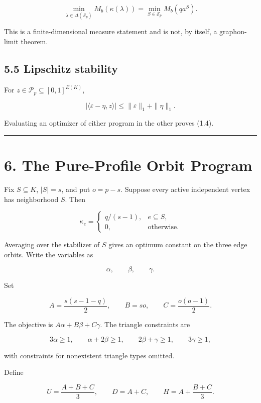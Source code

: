 \documentclass[11pt,a4paper]{article}
\begin{document}
\[
\boxed{
\min_{\lambda\in\Delta(\mathcal S_p)}M_b(\kappa(\lambda))
=
\min_{S\in\mathcal S_p}M_b(qa^S).
}
\tag{5.5}
\]

This is a finite-dimensional measure statement and is not, by itself, a graphon-limit theorem.

\subsection{5.5 Lipschitz stability}\label{lipschitz-stability}

For \(z\in\mathcal P_p\subseteq[0,1]^{E(K)}\),

\[
|\langle\varepsilon-\eta,z\rangle|
\le
\|\varepsilon\|_1+\|\eta\|_1.
\]

Evaluating an optimizer of either program in the other proves (1.4).

\begin{center}\rule{0.5\linewidth}{0.5pt}\end{center}

\section{6. The Pure-Profile Orbit Program}\label{the-pure-profile-orbit-program}

Fix \(S\subseteq K\), \(|S|=s\), and put \(o=p-s\). Suppose every active independent vertex has neighborhood \(S\). Then

\[
\kappa_e=
\begin{cases}
q/(s-1),&e\subseteq S,\\
0,&\text{otherwise}.
\end{cases}
\]

Averaging over the stabilizer of \(S\) gives an optimum constant on the three edge orbits. Write the variables as

\[
\alpha,\qquad\beta,\qquad\gamma.
\]

Set

\[
A=\frac{s(s-1-q)}2,
\qquad
B=so,
\qquad
C=\frac{o(o-1)}2.
\tag{6.1}
\]

The objective is \(A\alpha+B\beta+C\gamma\). The triangle constraints are

\[
3\alpha\ge1,\qquad
\alpha+2\beta\ge1,\qquad
2\beta+\gamma\ge1,\qquad
3\gamma\ge1,
\tag{6.2}
\]

with constraints for nonexistent triangle types omitted.

Define

\[
U=\frac{A+B+C}{3},
\qquad
D=A+C,
\qquad
H=A+\frac{B+C}{3}.
\tag{6.3}
\]
\end{document}
